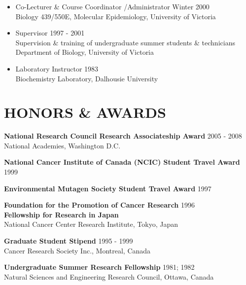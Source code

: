 \documentclass[margin]{res} %
\begin{document}
\begin{resume}
\begin{itemize}
\item Co-Lecturer \& Course Coordinator /Administrator \hfill Winter 2000\\
Biology 439/550E, Molecular Epidemiology, University of Victoria

\item Supervisor \hfill 1997 - 2001\\
Supervision \& training of undergraduate summer students \& technicians\\Department of Biology, University of Victoria

\item Laboratory Instructor \hfill 1983\\
Biochemistry Laboratory, Dalhousie University
\end{itemize}



{\color{blue}\section{HONORS \& AWARDS}}

\textbf{National Research Council Research Associateship Award} \hfill 2005 - 2008\\
National Academies, Washington D.C.

\textbf{National Cancer Institute of Canada (NCIC) Student Travel Award} \hfill 1999

\textbf{Environmental Mutagen Society Student Travel Award} \hfill 1997

\textbf{Foundation for the Promotion of Cancer Research} \hfill 1996\\
\-\hspace{0.4 cm}\textbf{Fellowship for Research in Japan}\\
National Cancer Center Research Institute, Tokyo, Japan

\textbf{Graduate Student Stipend} \hfill 1995 - 1999\\
Cancer Research Society Inc., Montreal, Canada

\textbf{Undergraduate Summer Research Fellowship} \hfill 1981; 1982\\
Natural Sciences and Engineering Research Council, Ottawa, Canada



\end{resume}
\end{document}
